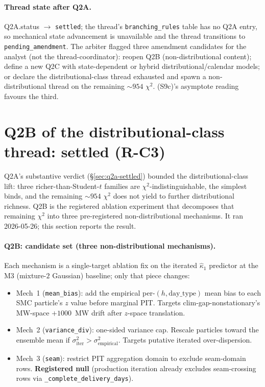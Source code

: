 \documentclass[11pt]{article}
\theoremstyle{definition}
\theoremstyle{plain}
\begin{document}
\paragraph{Thread state after Q2A.}
Q2A.status $\to$ \texttt{settled}; the thread's
\texttt{branching\_rules} table has no Q2A entry, so mechanical
state advancement is unavailable and the thread transitions to
\texttt{pending\_amendment}. The arbiter flagged three amendment
candidates for the analyst (not the thread-coordinator): reopen Q2B
(non-distributional content); define a new Q2C with state-dependent
or hybrid distributional/calendar models; or declare the
distributional-class thread exhausted and spawn a non-distributional
thread on the remaining $\sim 954$ $\chi^{2}$. (S9c)'s asymptote
reading favours the third.

\section{Q2B of the distributional-class thread: settled (R-C3)}
\label{sec:q2b-settled}

Q2A's substantive verdict (\S\ref{sec:q2a-settled}) bounded the
distributional-class lift: three richer-than-Student-$t$ families
are $\chi^{2}$-indistinguishable, the simplest binds, and the
remaining $\sim 954$ $\chi^{2}$ does not yield to further
distributional richness. Q2B is the registered ablation experiment
that decomposes that remaining $\chi^{2}$ into three pre-registered
non-distributional mechanisms. It ran 2026-05-26; this section
reports the result.

\paragraph{Q2B: candidate set (three non-distributional mechanisms).}
Each mechanism is a single-target ablation fix on the iterated
$\hat\kappa_{1}$ predictor at the M3 (mixture-$2$ Gaussian)
baseline; only that piece changes:
\begin{itemize}[leftmargin=2em]
\item Mech~1 (\texttt{mean\_bias}): add the empirical per-$(h,
\mathrm{day\_type})$ mean bias to each SMC particle's $z$ value
before marginal PIT. Targets clim-gap-nonstationary's MW-space
$+1000$~MW drift after $z$-space translation.
\item Mech~2 (\texttt{variance\_div}): one-sided variance cap.
Rescale particles toward the ensemble mean if $\sigma^{2}_{\mathrm{iter}}
> \sigma^{2}_{\mathrm{empirical}}$. Targets putative iterated
over-dispersion.
\item Mech~3 (\texttt{seam}): restrict PIT aggregation domain to
exclude seam-domain rows. \textbf{Registered null} (production
iteration already excludes seam-crossing rows via
\verb|_complete_delivery_days|).
\end{itemize}
\end{document}
